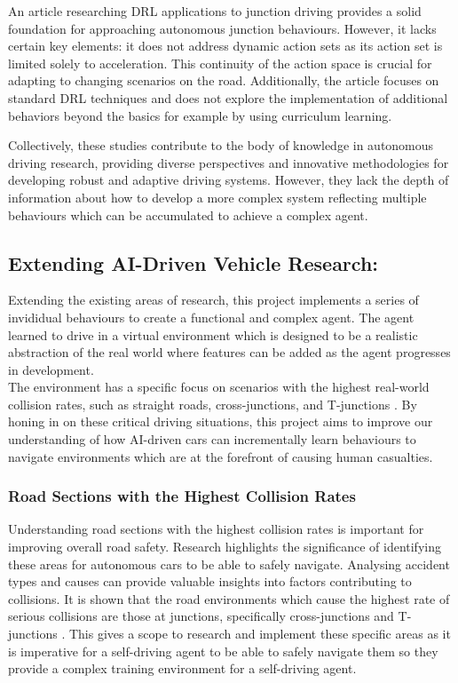 \documentclass{article}
\begin{document}
An article researching DRL applications to junction driving \cite{junction_driving} provides a solid foundation for approaching autonomous junction behaviours. However, it lacks certain key elements: it does not address dynamic action sets as its action set is limited solely to acceleration. This continuity of the action space is crucial for adapting to changing scenarios on the road. Additionally, the article focuses on standard DRL techniques and does not explore the implementation of additional behaviors beyond the basics for example by using curriculum learning. 

Collectively, these studies contribute to the body of knowledge in autonomous driving research, providing diverse perspectives and innovative methodologies for developing robust and adaptive driving systems. However, they lack the depth of information about how to develop a more complex system reflecting multiple behaviours which can be accumulated to achieve a complex agent. \\

\subsection{Extending AI-Driven Vehicle Research:}
Extending the existing areas of research, this project implements a series of invididual behaviours to create a functional and complex agent. The agent learned to drive in a virtual environment which is designed to be a realistic abstraction of the real world where features can be added as the agent progresses in development. \\ 

The environment has a specific focus on scenarios with the highest real-world collision rates, such as straight roads, cross-junctions, and T-junctions \cite{accident-types-and-causes}. By honing in on these critical driving situations, this project aims to improve our understanding of how AI-driven cars can incrementally learn behaviours to navigate environments which are at the forefront of causing human casualties. \\

\subsubsection{Road Sections with the Highest Collision Rates}
Understanding road sections with the highest collision rates is important for improving overall road safety. Research highlights the significance of identifying these areas for autonomous cars to be able to safely navigate. Analysing accident types and causes can provide valuable insights into factors contributing to collisions. It is shown that the road environments which cause the highest rate of serious collisions are those at junctions, specifically cross-junctions and T-junctions \cite{accident-types-and-causes}. This gives a scope to research and implement these specific areas as it is imperative for a self-driving agent to be able to safely navigate them so they provide a complex training environment for a self-driving agent.
\end{document}

